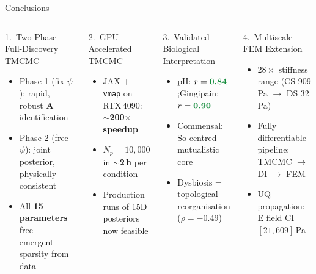 \documentclass[aspectratio=169,10pt,t]{beamer}
\newcommand{\hl}[1]{\textbf{\textcolor{ikm}{#1}}}
\newcommand{\hlg}[1]{\textbf{\textcolor{green2}{#1}}}
\begin{document}
\begin{frame}[t]{Conclusions}
  \small\vspace{-2pt}
  \begin{columns}[T]
      \begin{block}{1.\ Two-Phase Full-Discovery TMCMC}
        \begin{itemize}\setlength{\itemsep}{2pt}
          \item Phase 1 (fix-$\psi$): rapid, robust $\mathbf{A}$ identification
          \item Phase 2 (free $\psi$): joint posterior, physically consistent
          \item All \hl{15 parameters} free — emergent sparsity from data
        \end{itemize}
      \end{block}
      \vspace{4pt}
      \begin{block}{2.\ GPU-Accelerated TMCMC}
        \begin{itemize}\setlength{\itemsep}{2pt}
          \item JAX + \texttt{vmap} on RTX\,4090: \hl{$\sim$200$\times$ speedup}
          \item $N_p=10{,}000$ in \hl{$\sim$2\,h} per condition
          \item Production runs of 15D posteriors now feasible
        \end{itemize}
      \end{block}
      \begin{block}{3.\ Validated Biological Interpretation}
        \begin{itemize}\setlength{\itemsep}{2pt}
          \item pH: $r=\hlg{0.84}$;\quad Gingipain: $r=\hlg{0.90}$
          \item Commensal: So-centred mutualistic core
          \item Dysbiosis = topological reorganisation ($\rho=-0.49$)
        \end{itemize}
      \end{block}
      \vspace{4pt}
      \begin{block}{4.\ Multiscale FEM Extension}
        \begin{itemize}\setlength{\itemsep}{2pt}
          \item $28\times$ stiffness range (CS 909\,Pa $\to$ DS 32\,Pa)
          \item Fully differentiable pipeline: TMCMC $\to$ DI $\to$ FEM
          \item UQ propagation: E field CI $[21, 609]$\,Pa
        \end{itemize}
      \end{block}
  \end{columns}
\end{frame}
\end{document}
